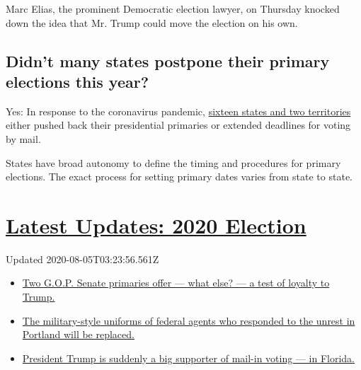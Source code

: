 Marc Elias, the prominent Democratic election lawyer, on Thursday
knocked down the idea that Mr. Trump could move the election on his own.

\hypertarget{didnt-many-states-postpone-their-primary-elections-this-year}{%
\subsection{Didn't many states postpone their primary elections this
year?}\label{didnt-many-states-postpone-their-primary-elections-this-year}}

Yes: In response to the coronavirus pandemic,
\href{https://www.nytimes3xbfgragh.onion/article/2020-campaign-primary-calendar-coronavirus.html}{sixteen
states and two territories} either pushed back their presidential
primaries or extended deadlines for voting by mail.

States have broad autonomy to define the timing and procedures for
primary elections. The exact process for setting primary dates varies
from state to state.

\hypertarget{latest-updates-2020-election}{%
\section{\texorpdfstring{\href{https://www.nytimes3xbfgragh.onion/2020/08/04/us/elections/primary-election-michigan-arizona-kansas.html?action=click\&pgtype=Article\&state=default\&region=MAIN_CONTENT_1\&context=storylines_live_updates}{Latest
Updates: 2020
Election}}{Latest Updates: 2020 Election}}\label{latest-updates-2020-election}}

Updated 2020-08-05T03:23:56.561Z

\begin{itemize}
\tightlist
\item
  \href{https://www.nytimes3xbfgragh.onion/2020/08/04/us/elections/primary-election-michigan-arizona-kansas.html?action=click\&pgtype=Article\&state=default\&region=MAIN_CONTENT_1\&context=storylines_live_updates\#link-3924dd44}{Two
  G.O.P. Senate primaries offer --- what else? --- a test of loyalty to
  Trump.}
\item
  \href{https://www.nytimes3xbfgragh.onion/2020/08/04/us/elections/primary-election-michigan-arizona-kansas.html?action=click\&pgtype=Article\&state=default\&region=MAIN_CONTENT_1\&context=storylines_live_updates\#link-62a8e06b}{The
  military-style uniforms of federal agents who responded to the unrest
  in Portland will be replaced.}
\item
  \href{https://www.nytimes3xbfgragh.onion/2020/08/04/us/elections/primary-election-michigan-arizona-kansas.html?action=click\&pgtype=Article\&state=default\&region=MAIN_CONTENT_1\&context=storylines_live_updates\#link-32b39e33}{President
  Trump is suddenly a big supporter of mail-in voting --- in Florida.}
\end{itemize}


